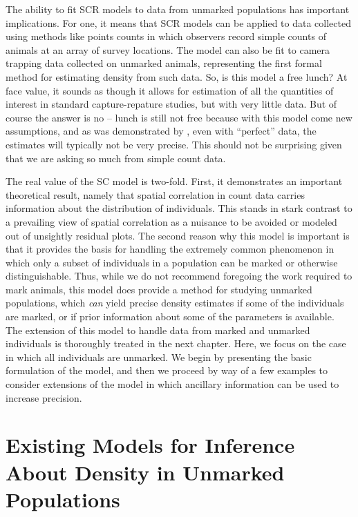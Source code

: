 The ability to fit SCR models to data from unmarked populations has
important implications. For one, it means that SCR models can
be applied to data collected using methods like points counts in which
observers record simple counts of animals at an array of survey
locations. The model can also be fit to camera trapping data collected on
unmarked animals, representing the first formal method for estimating
density from such data.
So, is this model a free lunch? At face value, it sounds as though it
allows for estimation of
all the quantities of interest in standard
capture-repature studies, but with very little
data. But of course the answer is no --
lunch is still not free because
with this model come new assumptions,
and as was demonstrated by
\citet{chandler_royle:2012}, even with ``perfect'' data, the estimates
will typically not be very precise. %
This should
not be surprising given that we are asking so much from simple count
data.

The real value of the SC model is two-fold. First, it demonstrates
an important theoretical result, namely
that spatial correlation in
count data carries information about the distribution of
individuals. This stands in stark contrast to a prevailing view of
spatial correlation as a nuisance to be avoided or modeled out of unsightly
residual plots. The second reason why this model is important is that
it provides the basis for handling the extremely common phenomenon in
which only a subset of individuals in a population can be marked or otherwise
distinguishable. Thus, while we do not recommend foregoing the work
required to mark animals, this model does provide a method for
studying unmarked populations, which \textit{can} yield precise
density estimates if some of the individuals are marked, or if prior
information about some of the parameters is available.
The extension of this model to handle data from marked and unmarked
individuals is thoroughly treated in the next chapter. Here, we focus
on the case in which all individuals are unmarked. We begin by
presenting the basic formulation of the model, and then we proceed by
way of a few examples to consider extensions of the model in which
ancillary information can be used to increase precision.

\section{Existing Models for Inference About Density in Unmarked Populations}
\label{Sect.existing-unmarked}

